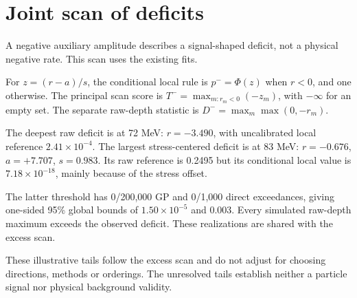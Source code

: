\section{Joint scan of deficits}\label{sec:v5-deficit}
A negative auxiliary amplitude describes a signal-shaped deficit, not a physical negative rate. This scan uses the existing fits.


For $z=(r-a)/s$, the conditional local rule is $p^-=\Phi(z)$ when $r<0$, and one otherwise. The principal scan score is $T^-=\max_{m:r_m<0}(-z_m)$, with $-\infty$ for an empty set. The separate raw-depth statistic is $D^-=\max_m\max(0,-r_m)$.

The deepest raw deficit is at 72 MeV: $r=-3.490$, with uncalibrated local reference $2.41\times10^{-4}$. The largest stress-centered deficit is at 83 MeV: $r=-0.676$, $a=+7.707$, $s=0.983$. Its raw reference is 0.2495 but its conditional local value is $7.18\times10^{-18}$, mainly because of the stress offset.

The latter threshold has 0/200,000 GP and 0/1,000 direct exceedances, giving one-sided 95\% global bounds of $1.50\times10^{-5}$ and 0.003. Every simulated raw-depth maximum exceeds the observed deficit. These realizations are shared with the excess scan.

These illustrative tails follow the excess scan and do not adjust for choosing directions, methods or orderings. The unresolved tails establish neither a particle signal nor physical background validity.
